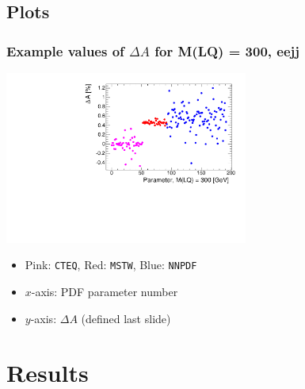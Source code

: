 \documentclass[bigger]{beamer}
\begin{document}
\subsection{Plots}
\label{sec-2-2}
\begin{frame}
\frametitle{Example values of $\Delta A$ for M(LQ) = 300, eejj}
\label{sec-2-2-1}
\label{sec-2-2-1-1}

\centering
\includegraphics[width=0.6\textwidth]{fig/eejj_300_2D.pdf}
\label{sec-2-2-1-2}

\centering
\begin{itemize}

\item Pink: \texttt{CTEQ}, Red: \texttt{MSTW}, Blue: \texttt{NNPDF}
\label{sec-2-2-1-2-1}%

\item $x$-axis: PDF parameter number
\label{sec-2-2-1-2-2}%

\item $y$-axis: $\Delta A$ (defined last slide)
\label{sec-2-2-1-2-3}%
\end{itemize} %
\end{frame}
\section{Results}
\label{sec-3}
\end{document}
